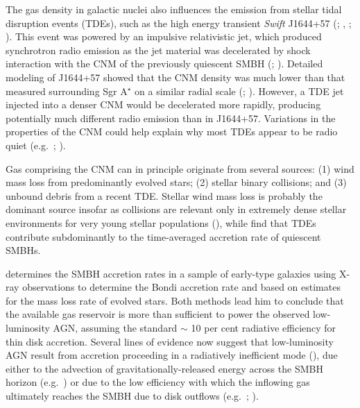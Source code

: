 \documentclass[usenatbib,fleqn]{mn2e}
\newcommand{\Mbh}[1][]{M_{\bullet#1}}
\begin{document}

The gas density in galactic nuclei also influences the emission from
stellar tidal disruption events (TDEs), such as the high energy
transient {\it Swift} J1644+57 (\citealt{Levan+11};
\citealt{Bloom+11}, \citealt{Burrows+11}; \citealt{Zauderer+11}).
This event was powered by an impulsive relativistic jet,
which produced synchrotron radio emission as the jet material was
decelerated by shock interaction with the CNM of the previously
quiescent SMBH (\citealt{Giannios&Metzger11}; \citealt{Zauderer+11}).
Detailed modeling of J1644+57 showed that the CNM density was much
lower than that measured surrounding Sgr A$^{\star}$ on a similar radial scale
(\citealt{Metzger+12}; \citealt{BergerZauderer+:2012a}).  However, a TDE jet
injected into a denser CNM would be decelerated more rapidly,
producing potentially much different radio emission than in J1644+57.
Variations in the properties of the CNM could help explain why most
TDEs appear to be radio quiet (e.g.~\citealt{Bower+13};
\citealt{VanVelzen+13}).

Gas comprising the CNM can in principle originate from several
sources: (1) wind mass loss from predominantly evolved stars; (2)
stellar binary collisions; and (3) unbound debris from a recent TDE.
Stellar wind mass loss is probably the dominant source insofar as
collisions are relevant only in extremely dense stellar environments
for very young stellar populations (\citealt{Rubin&Loeb11}), while
\citet{MacLeod+13} find that TDEs contribute subdominantly to the
time-averaged accretion rate of quiescent SMBHs.

\citet{Ho:2009a} determines the SMBH accretion rates in a sample of
early-type galaxies using X-ray observations to determine the
Bondi accretion rate and based on estimates for the mass loss rate of
evolved stars.  Both methods lead him to conclude that the available
gas reservoir is more than sufficient to power the observed
low-luminosity AGN, assuming the standard $\sim$ 10 per cent radiative
efficiency for thin disk accretion.  Several lines of evidence now suggest that low-luminosity AGN result from accretion
proceeding in a radiatively inefficient mode
(\citealt{Yuan&Narayan14}), due either to the advection of
gravitationally-released energy across the SMBH horizon
(e.g.~\citealt{Narayan&Yi95}) or due to the low efficiency with which the inflowing gas ultimately reaches the SMBH due to disk outflows (e.g.~\citealt{Blandford&Begelman99}; \citealt{Li+13}).
\end{document}
